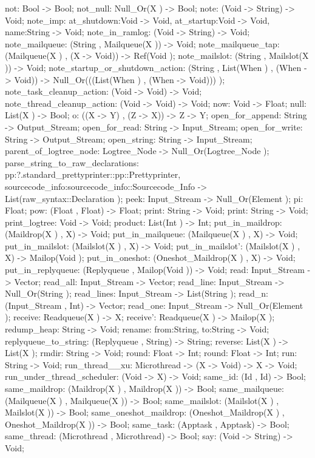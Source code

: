 not: Bool -> Bool;
not_null: Null_Or(X ) -> Bool;
note: (Void -> String) -> Void;
note_imp: {at_shutdown:Void -> Void, at_startup:Void -> Void, name:String} -> Void;
note_in_ramlog: (Void -> String) -> Void;
note_mailqueue: (String , Mailqueue(X )) -> Void;
note_mailqueue_tap: (Mailqueue(X ) , (X -> Void)) -> Ref(Void );
note_mailslot: (String , Mailslot(X )) -> Void;
note_startup_or_shutdown_action:
(String , List(When ) , (When -> Void)) -> Null_Or(((List(When ) , (When -> Void))) );
note_task_cleanup_action: (Void -> Void) -> Void;
note_thread_cleanup_action: (Void -> Void) -> Void;
now: Void -> Float;
null: List(X ) -> Bool;
o: ((X -> Y) , (Z -> X)) -> Z -> Y;
open_for_append: String -> Output_Stream;
open_for_read: String -> Input_Stream;
open_for_write: String -> Output_Stream;
open_string: String -> Input_Stream;
parent_of_logtree_node: Logtree_Node -> Null_Or(Logtree_Node );
parse_string_to_raw_declarations:
    {pp:?.standard_prettyprinter::pp::Prettyprinter, sourcecode_info:sourcecode_info::Sourcecode_Info}
    ->
    List(raw_syntax::Declaration );
peek: Input_Stream -> Null_Or(Element );
pi: Float;
pow: (Float , Float) -> Float;
print: String -> Void;
print: String -> Void;
print_logtree: Void -> Void;
product: List(Int ) -> Int;
put_in_maildrop: (Maildrop(X ) , X) -> Void;
put_in_mailqueue: (Mailqueue(X ) , X) -> Void;
put_in_mailslot: (Mailslot(X ) , X) -> Void;
put_in_mailslot': (Mailslot(X ) , X) -> Mailop(Void );
put_in_oneshot: (Oneshot_Maildrop(X ) , X) -> Void;
put_in_replyqueue: (Replyqueue , Mailop(Void )) -> Void;
read: Input_Stream -> Vector;
read_all: Input_Stream -> Vector;
read_line: Input_Stream -> Null_Or(String );
read_lines: Input_Stream -> List(String );
read_n: (Input_Stream , Int) -> Vector;
read_one: Input_Stream -> Null_Or(Element );
receive: Readqueue(X ) -> X;
receive': Readqueue(X ) -> Mailop(X );
redump_heap: String -> Void;
rename: {from:String, to:String} -> Void;
replyqueue_to_string: (Replyqueue , String) -> String;
reverse: List(X ) -> List(X );
rmdir: String -> Void;
round: Float -> Int;
round: Float -> Int;
run: String -> Void;
run_thread__xu: Microthread -> (X -> Void) -> X -> Void;
run_under_thread_scheduler: (Void -> X) -> Void;
same_id: (Id , Id) -> Bool;
same_maildrop: (Maildrop(X ) , Maildrop(X )) -> Bool;
same_mailqueue: (Mailqueue(X ) , Mailqueue(X )) -> Bool;
same_mailslot: (Mailslot(X ) , Mailslot(X )) -> Bool;
same_oneshot_maildrop: (Oneshot_Maildrop(X ) , Oneshot_Maildrop(X )) -> Bool;
same_task: (Apptask , Apptask) -> Bool;
same_thread: (Microthread , Microthread) -> Bool;
say: (Void -> String) -> Void;
